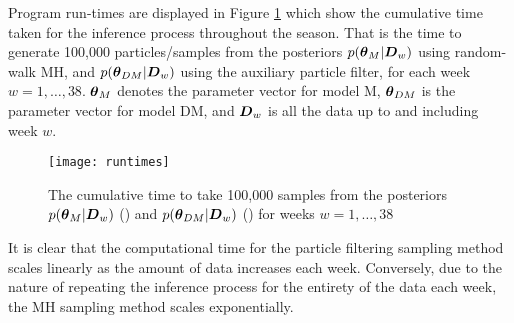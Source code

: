 
Program run-times are displayed in Figure \ref{fig:runtimes} which show the cumulative time taken for the inference
process throughout the season. That is the time to generate 100,000 particles/samples from the posteriors
\(p(\boldsymbol{\theta}_M | \boldsymbol{D}_w)\) using random-walk \gls{MH}, and \(p(\boldsymbol{\theta}_{DM} | \boldsymbol{D}_w)\) using the auxiliary
particle filter, for each week \(w = 1, \ldots, 38\). \(\boldsymbol{\theta}_M\) denotes the parameter vector for model M,
\(\boldsymbol{\theta}_{DM}\) is the parameter vector for model DM, and \(\boldsymbol{D}_w\) is all the data up to and including week
\(w\).
\begin{figure}[htp]
\begin{center}
\texttt{[image: runtimes]}
\caption{The cumulative time to take 100,000 samples from the posteriors \(p(\boldsymbol{\theta}_M | \boldsymbol{D}_w)\)
(\protect\blackSolidLine) and \(p(\boldsymbol{\theta}_{DM} | \boldsymbol{D}_w)\) (\protect\redSolidLine) for weeks \(w = 1, \ldots, 38\)}
\label{fig:runtimes}
\end{center}
\end{figure}
It is clear that the computational time for the particle filtering sampling method scales linearly as the amount of data
increases each week. Conversely, due to the nature of repeating the inference process for the entirety of the data each
week, the \gls{MH} sampling method scales exponentially.

